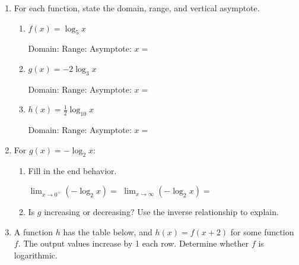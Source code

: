 \documentclass[10pt]{article}
\begin{document}
\namedateperiod

\vspace{0.1in}

\begin{enumerate}[leftmargin=1.8em, itemsep=14pt]

\item For each function, state the domain, range, and vertical asymptote.

\begin{enumerate}[leftmargin=1.5em, itemsep=10pt, label=\alph*.]
  \item $f(x) = \log_5 x$

  \vspace{4pt}
  Domain: \blank{3.5cm} \quad Range: \blank{3.5cm} \quad Asymptote: $x = $ \blank{1.5cm}

  \item $g(x) = -2\log_3 x$

  \vspace{4pt}
  Domain: \blank{3.5cm} \quad Range: \blank{3.5cm} \quad Asymptote: $x = $ \blank{1.5cm}

  \item $h(x) = \tfrac{1}{2}\log_{10} x$

  \vspace{4pt}
  Domain: \blank{3.5cm} \quad Range: \blank{3.5cm} \quad Asymptote: $x = $ \blank{1.5cm}
\end{enumerate}

\item For $g(x) = -\log_2 x$:

\begin{enumerate}[leftmargin=1.5em, itemsep=8pt, label=\alph*.]
  \item Fill in the end behavior.

  \vspace{4pt}
  $\displaystyle\lim_{x \to 0^+} (-\log_2 x) = $ \blank{3cm} \qquad
  $\displaystyle\lim_{x \to \infty} (-\log_2 x) = $ \blank{3cm}

  \item Is $g$ increasing or decreasing? Use the inverse relationship to explain.

\end{enumerate}

\item A function $h$ has the table below, and $h(x) = f(x + 2)$ for some function $f$.
      The output values increase by 1 each row. Determine whether $f$ is logarithmic.


\end{enumerate}
\end{document}
